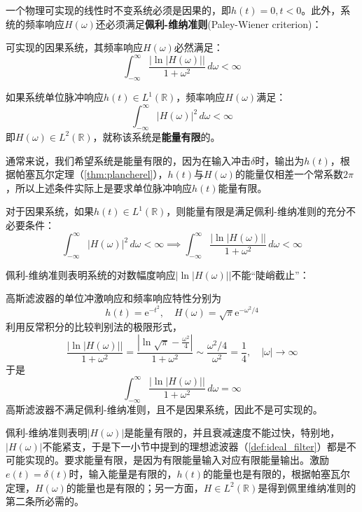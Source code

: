 一个物理可实现的线性时不变系统必须是因果的，即$h(t)=0,t<0$。此外，系统的频率响应$H(\omega)$还必须满足\textbf{佩利-维纳准则}(Paley-Wiener criterion)\cite{signal_systems}：
\begin{definition}[佩利-维纳准则]\label{def:paley_winner}
    可实现的因果系统，其频率响应$H(\omega)$必然满足：
    \[\int_{-\infty}^{\infty}\frac{\left|\ln\left|H(\omega)\right|\right|}{1+\omega^2}\,d\omega<\infty\]
\end{definition}
\begin{definition}[能量有限系统]
    如果系统单位脉冲响应$h(t)\in L^1(\mathbb{R})$，频率响应$H(\omega)$满足：
    $$\int_{-\infty}^{\infty}\left|H(\omega)\right|^2\,d\omega<\infty$$
    即$H(\omega)\in L^2(\mathbb{R})$，就称该系统是\textbf{能量有限}的。
\end{definition}
通常来说，我们希望系统是能量有限的，因为在输入冲击$\delta$时，输出为$h(t)$，根据帕塞瓦尔定理（\cref{thm:plancherel}），$h(t)$与$H(\omega)$的能量仅相差一个常系数$2\pi$，所以上述条件实际上是要求单位脉冲响应$h(t)$能量有限。
\begin{claim}
    对于因果系统，如果$h(t)\in L^1(\mathbb{R})$，则能量有限是满足佩利-维纳准则的充分不必要条件：
    \[\int_{-\infty}^{\infty}\left|H(\omega)\right|^2\,d\omega<\infty\implies\int_{-\infty}^{\infty}\frac{\left|\ln\left|H(\omega)\right|\right|}{1+\omega^2}\,d\omega<\infty\]
\end{claim}

佩利-维纳准则表明系统的对数幅度响应$\left|\ln\left|H(\omega)\right|\right|$不能“陡峭截止”：
\begin{example}
    高斯滤波器的单位冲激响应和频率响应特性分别为
    $$h(t)=\mathrm{e}^{-t^2},\quad H(\omega)=\sqrt{\pi}\mathrm{e}^{-\omega^2/4}$$
    利用反常积分的比较判别法的极限形式，
    \[\frac{|\ln\left|H(\omega)\right||}{1+\omega^2}=\frac{\left|\ln \sqrt{\pi}-\frac{\omega^2}{4}\right|}{1+\omega^2}\sim \frac{\omega^2/4}{\omega^2}=\frac{1}{4},\quad |\omega|\to\infty\]
    于是
    \[\int_{-\infty}^{\infty}\frac{\left|\ln\left|H(\omega)\right|\right|}{1+\omega^2}\,d\omega=\infty\]
    高斯滤波器不满足佩利-维纳准则，且不是因果系统，因此不是可实现的。
\end{example}

佩利-维纳准则表明$\left|H(\omega)\right|$是能量有限的，并且衰减速度不能过快，特别地，$\left|H(\omega)\right|$不能紧支，于是下一小节中提到的理想滤波器（\cref{def:ideal_filter}）都是不可能实现的。要求能量有限，是因为有限能量输入对应有限能量输出。激励$e(t)=\delta(t)$时，输入能量是有限的，$h(t)$的能量也是有限的，根据帕塞瓦尔定理，$H(\omega)$的能量也是有限的；另一方面，$H\in L^2(\mathbb{R})$是得到佩里维纳准则的第二条所必需的。

